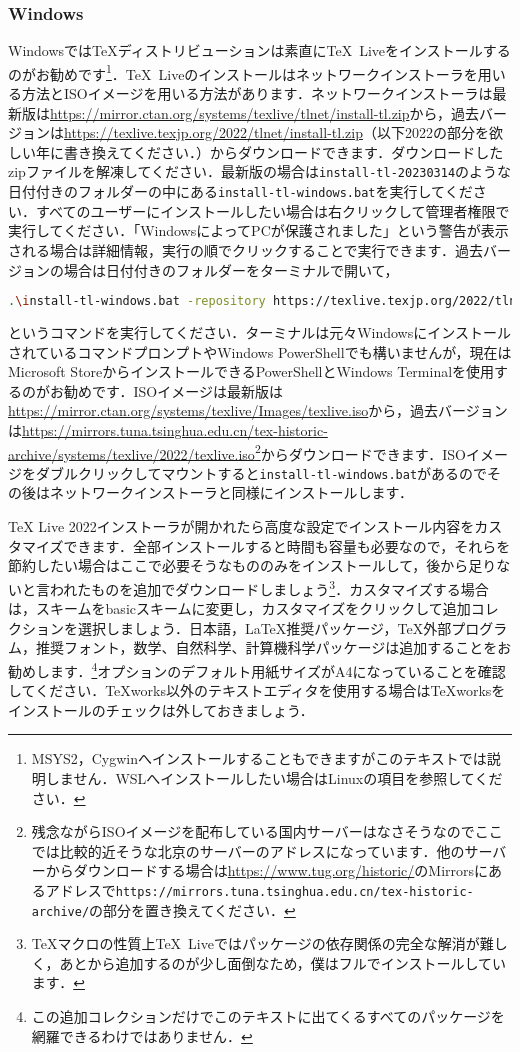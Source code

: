 \subsubsection*{Windows}
Windowsでは\TeX ディストリビューションは素直に\TeX\ Liveをインストールするのがお勧めです\footnote{MSYS2，Cygwinへインストールすることもできますがこのテキストでは説明しません．WSLへインストールしたい場合はLinuxの項目を参照してください．}．\TeX\ Liveのインストールはネットワークインストーラを用いる方法とISOイメージを用いる方法があります．ネットワークインストーラは最新版は\url{https://mirror.ctan.org/systems/texlive/tlnet/install-tl.zip}から，過去バージョンは\url{https://texlive.texjp.org/2022/tlnet/install-tl.zip}（以下2022の部分を欲しい年に書き換えてください．）からダウンロードできます．ダウンロードしたzipファイルを解凍してください．最新版の場合は\texttt{install-tl-20230314}のような日付付きのフォルダーの中にある\texttt{install-tl-windows.bat}を実行してください．すべてのユーザーにインストールしたい場合は右クリックして管理者権限で実行してください．「WindowsによってPCが保護されました」という警告が表示される場合は詳細情報，実行の順でクリックすることで実行できます．過去バージョンの場合は日付付きのフォルダーをターミナルで開いて，
\begin{lstlisting}[language=bash]
	.\install-tl-windows.bat -repository https://texlive.texjp.org/2022/tlnet/
\end{lstlisting}
というコマンドを実行してください．ターミナルは元々WindowsにインストールされているコマンドプロンプトやWindows PowerShellでも構いませんが，現在はMicrosoft StoreからインストールできるPowerShellとWindows Terminalを使用するのがお勧めです．ISOイメージは最新版は\url{https://mirror.ctan.org/systems/texlive/Images/texlive.iso}から，過去バージョンは\url{https://mirrors.tuna.tsinghua.edu.cn/tex-historic-archive/systems/texlive/2022/texlive.iso}\footnote{残念ながらISOイメージを配布している国内サーバーはなさそうなのでここでは比較的近そうな北京のサーバーのアドレスになっています．他のサーバーからダウンロードする場合は\url{https://www.tug.org/historic/}のMirrorsにあるアドレスで\texttt{https://mirrors.tuna.tsinghua.edu.cn/tex-historic-archive/}の部分を置き換えてください．}からダウンロードできます．ISOイメージをダブルクリックしてマウントすると\texttt{install-tl-windows.bat}があるのでその後はネットワークインストーラと同様にインストールします．

TeX Live 2022インストーラが開かれたら高度な設定でインストール内容をカスタマイズできます．全部インストールすると時間も容量も必要なので，それらを節約したい場合はここで必要そうなもののみをインストールして，後から足りないと言われたものを追加でダウンロードしましょう\footnote{\TeX マクロの性質上\TeX\ Liveではパッケージの依存関係の完全な解消が難しく，あとから追加するのが少し面倒なため，僕はフルでインストールしています．}．カスタマイズする場合は，スキームをbasicスキームに変更し，カスタマイズをクリックして追加コレクションを選択しましょう．日本語，LaTeX推奨パッケージ，TeX外部プログラム，推奨フォント，数学、自然科学、計算機科学パッケージは追加することをお勧めします．\footnote{この追加コレクションだけでこのテキストに出てくるすべてのパッケージを網羅できるわけではありません．}オプションのデフォルト用紙サイズがA4になっていることを確認してください．TeXworks以外のテキストエディタを使用する場合はTeXworksをインストールのチェックは外しておきましょう．